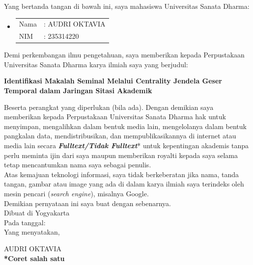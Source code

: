 \documentclass[oneside, 12pt, a4paper]{book}
\def\title{Identifikasi Makalah Seminal Melalui Centrality Jendela Geser Temporal dalam Jaringan Sitasi Akademik}
\def\author{AUDRI OKTAVIA}
\def\nim{235314220}
\numberwithin{equation}{chapter}
\numberwithin{algorithm}{chapter}
\begin{document}
\vspace{1em}

\noindent Yang bertanda tangan di bawah ini, saya mahasiswa Universitas Sanata Dharma:
\begin{itemize}[label={}]
	\item \begin{tabular}{@{}ll@{}}
		Nama & : \author \\
		NIM  & : \nim
	\end{tabular}
\end{itemize}

\noindent Demi perkembangan ilmu pengetahuan, 
saya memberikan kepada Perpustakaan Universitas Sanata Dharma karya ilmiah saya yang berjudul:

\vspace{-0.75em}
	\begin{center}
		\textbf{\title}
	\end{center}
\vspace{-0.75em}

\noindent Beserta perangkat yang diperlukan (bila ada). 
Dengan demikian saya memberikan kepada Perpustakaan Universitas Sanata Dharma hak untuk menyimpan,
mengalihkan dalam bentuk media lain, mengelolanya dalam bentuk pangkalan data, mendistribusikan, 
dan mempublikasikannya di internet atau media lain secara \textbf{\textit{Fulltext/Tidak Fulltext}}* 
untuk kepentingan akademis tanpa perlu meminta ijin dari saya maupun memberikan royalti kepada
saya selama tetap mencantumkan nama saya sebagai penulis.\\

\noindent Atas kemajuan teknologi informasi, saya tidak berkeberatan jika nama, tanda tangan, gambar atau image
yang ada di dalam karya ilmiah saya terindeks oleh mesin pencari (\textit{search engine}), misalnya Google.\\

\noindent Demikian pernyataan ini saya buat dengan sebenarnya.\\

\noindent Dibuat di Yogyakarta\\
\noindent Pada tanggal: \makebox[3cm]{\dotfill}\\
Yang menyatakan,\\
\vspace{1cm}

\noindent \author\\

\noindent \textbf{*Coret salah satu}


\clearpage
\end{document}
